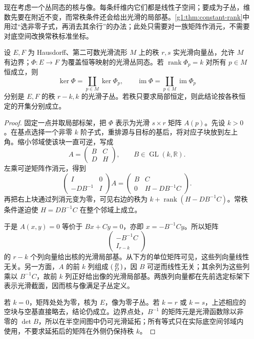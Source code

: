 现在考虑一个丛同态的核与像。每条纤维内它们都是线性子空间；要成为子丛，维数先要在附近不变，而常秩条件还会给出光滑的局部基。\cref{g1:thm:constant-rank}中用过“选非零子式，再消去其余行”的办法；此处只需要对一族矩阵作消元，不需要对底空间改换常秩标准坐标。

\begin{theorem}
	\label{g1:thm:constant-rank-bundle-morphism}
	设 \(E,F\) 为 Hausdorff、第二可数光滑流形 \(M\) 上的秩 \(r,s\) 实光滑向量丛，允许 \(M\) 有边界；\(\Phi:E\to F\) 为覆盖恒等映射的光滑丛同态。若 \(\operatorname{rank}\Phi_p=k\) 对所有 \(p\in M\) 恒成立，则
	\[
		\ker\Phi=\coprod_{p\in M}\ker\Phi_p,\qquad
		\operatorname{im}\Phi=\coprod_{p\in M}\operatorname{im}\Phi_p
	\]
	分别是 \(E,F\) 的秩 \(r-k,k\) 的光滑子丛。若秩只要求局部恒定，则此结论按各秩恒定的开集分别成立。
\end{theorem}
\begin{proof}
	固定一点并取局部标架，把 \(\Phi\) 表示为光滑 \(s\times r\) 矩阵 \(A(p)\)。先设 \(k>0\)。在基点选择一个非零 \(k\) 阶子式，重排源与目标的基后，将对应子块放到左上角。缩小邻域使该块一直可逆，写成
	\[
		A=\begin{pmatrix}B&C\\D&H\end{pmatrix},\qquad B\in\operatorname{GL}(k,\mathbb R).
	\]
	左乘可逆矩阵作消元，得到
	\[
		\begin{pmatrix}I&0\\-DB^{-1}&I\end{pmatrix}A
		=\begin{pmatrix}B&C\\0&H-DB^{-1}C\end{pmatrix}.
	\]
	再把右上块通过列消元变为零，可见右边的秩为 \(k+\operatorname{rank}(H-DB^{-1}C)\)。常秩条件遂迫使 \(H=DB^{-1}C\) 在整个邻域上成立。

	于是 \(A(x,y)=0\) 等价于 \(Bx+Cy=0\)，亦即 \(x=-B^{-1}Cy\)。所以矩阵
	\[
		\begin{pmatrix}-B^{-1}C\\I_{r-k}\end{pmatrix}
	\]
	的 \(r-k\) 个列向量给出核的光滑局部基。从下方的单位矩阵可见，这些列向量线性无关。另一方面，\(A\) 的前 \(k\) 列组成 \(\begin{psmallmatrix}B\\D\end{psmallmatrix}\)，因 \(B\) 可逆而线性无关；其余列为这些列乘以 \(B^{-1}C\)，故前 \(k\) 列正好给出像的光滑局部基。两族列向量都在先前选定标架下表示光滑截面，因而核与像满足子丛定义。

	若 \(k=0\)，矩阵处处为零，核为 \(E\)，像为零子丛。若 \(k=r\) 或 \(k=s\)，上述相应的空块与空基直接略去，结论仍成立。边界点处，\(B^{-1}\) 的矩阵元是光滑函数除以非零的 \(\det B\)，所以在半空间图中仍可光滑延拓；所有等式只在实际底空间邻域内使用，不要求延拓后的矩阵在外侧仍保持秩 \(k\)。
\end{proof}

